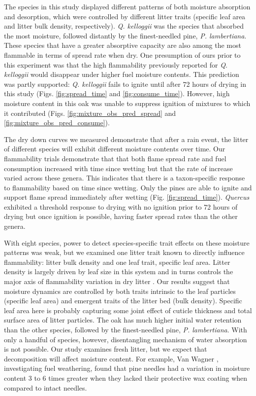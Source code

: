 \documentclass[fire,article,submit,moreauthors,pdftex]{Definitions/mdpi}
\begin{document}
The species in this study displayed different patterns of both moisture absorption and desorption, which were controlled by different litter traits (specific leaf area and litter bulk density, respectively). \emph{Q. kelloggii} was the species that absorbed the most moisture, followed distantly by the finest-needled pine, \emph{P. lambertiana}. These species that have a greater absorptive capacity are also among the most flammable in terms of spread rate when dry. One presumption of ours prior to this experiment was that the high flammability previously reported for \emph{Q. kelloggii} \cite{Magalhaes+Schwilk-2012} would disappear under higher fuel moisture contents. This prediction was partly supported: \emph{Q. kelloggii} fails to ignite until after 72 hours of drying in this study (Figs. \ref{fig:spread_time} and \ref{fig:consume_time}). However, high moisture content in this oak was unable to suppress ignition of mixtures to which it contributed (Figs. \ref{fig:mixture_obs_pred_spread} and \ref{fig:mixture_obs_pred_consume}). 

    The dry down curves we measured demonstrate that after a rain event, the litter of different species will exhibit different moisture contents over time. Our flammability trials demonstrate that that both flame spread rate and fuel consumption increased with time since wetting but that the rate of increase varied across these genera. This indicates that there is a taxon-specific response to flammability based on time since wetting.  Only the pines are able to ignite and support flame spread immediately after wetting (Fig. \ref{fig:spread_time}). \emph{Quercus} exhibited a threshold response to drying with no ignition prior to 72 hours of drying but once ignition is possible, having faster spread rates than the other genera.

    
With eight species, power to detect species-specific trait effects on these moisture patterns was weak, but we examined one litter trait known to directly influence flammability: litter bulk density and one leaf trait, specific leaf area. Litter density is largely driven by leaf size in this system  and in turns controls the major axis of flammability variation in dry litter \cite{Magalhaes+Schwilk-2012}. Our results suggest that moisture dynamics are controlled by both traits intrinsic to the leaf particles (specific leaf area) and emergent traits of the litter bed (bulk density). Specific leaf area here is probably capturing some joint effect of cuticle thickness and total surface area of litter particles.  The oak has much higher initial water retention than the other species, followed by the finest-needled pine, \emph{P. lambertiana}. With only a handful of species, however, disentangling mechanism of water absorption is not possible. Our study examines fresh litter, but we expect that decomposition will affect moisture content. For example, Van Wagner \cite{Van_Wagner-1969}, investigating fuel weathering, found that pine needles had a variation in moisture content 3 to 6 times greater when they lacked their protective wax coating when compared to intact needles.
\end{document}
